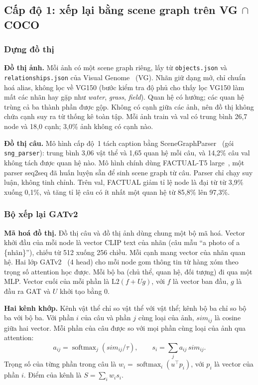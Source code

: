 \subsection{Cấp độ 1: xếp lại bằng scene graph trên VG $\cap$ COCO}
\label{sec:method-l1}

\subsubsection{Dựng đồ thị}\label{sec:l1-graphs}
\textbf{Đồ thị ảnh.} Mỗi ảnh có một scene graph riêng, lấy từ \texttt{objects.json} và \texttt{relationships.json} của
Visual Genome~\cite{krishna2017vg} (VG). Nhãn giữ dạng mở, chỉ chuẩn hoá alias, không lọc về VG150 (bước kiểm tra độ phủ cho
thấy lọc VG150 làm mất các nhãn hay gặp như \emph{water}, \emph{grass}, \emph{field}). Quan hệ có hướng; các quan hệ trùng
cả ba thành phần được gộp. Không có cạnh giữa các ảnh, nên đồ thị không chứa cạnh suy ra từ thống kê toàn tập. Mỗi ảnh
train và val có trung bình 26,7 node và 18,0 cạnh; 3,0\% ảnh không có cạnh nào.

\textbf{Đồ thị câu.} Mô hình cấp độ~1 tách caption bằng SceneGraphParser~\cite{schuster2015sgparser} (gói
\texttt{sng\_parser}): trung bình 3,06 vật thể và 1,65 quan hệ mỗi câu, và 14,2\% câu val không tách được quan hệ nào. Mô
hình chính dùng FACTUAL-T5 large~\cite{li2023factual}, một parser seq2seq đã huấn luyện sẵn để sinh scene graph từ câu.
Parser chỉ chạy suy luận, không tinh chỉnh. Trên val, FACTUAL giảm tỉ lệ node là đại từ từ 3,9\% xuống 0,1\%, và tăng tỉ lệ
câu có ít nhất một quan hệ từ 85,8\% lên 97,3\%.

\subsubsection{Bộ xếp lại GATv2}\label{sec:l1-model}
\textbf{Mã hoá đồ thị.} Đồ thị câu và đồ thị ảnh dùng chung một bộ mã hoá. Vector khởi đầu của mỗi node là vector CLIP
text của nhãn (câu mẫu ``a photo of a \{nhãn\}''), chiếu từ 512 xuống 256 chiều. Mỗi cạnh mang vector của nhãn quan hệ.
Hai lớp GATv2~\cite{brody2022gatv2} (4 head) cho mỗi node gom thông tin từ hàng xóm theo trọng số attention học được. Mỗi
bộ ba (chủ thể, quan hệ, đối tượng) đi qua một MLP. Vector cuối của mỗi phần là $\mathrm{L2}(f + U g)$, với $f$ là vector
ban đầu, $g$ là đầu ra GAT và $U$ khởi tạo bằng 0.

\textbf{Hai kênh khớp.} Kênh vật thể chỉ so vật thể với vật thể; kênh bộ ba chỉ so bộ ba với bộ ba. Với phần $i$ của câu
và phần $j$ cùng loại của ảnh, $\mathit{sim}_{ij}$ là cosine giữa hai vector. Mỗi phần của câu được so với mọi phần cùng
loại của ảnh qua attention:
\begin{equation}
a_{ij} = \operatorname{softmax}_j\!\left(\mathit{sim}_{ij}/\tau\right),\qquad s_i = \textstyle\sum_j a_{ij}\,\mathit{sim}_{ij}.
\end{equation}
Trọng số của từng phần trong câu là
$w_i = \operatorname{softmax}_i(u^\top p_i)$, với $p_i$ là vector của phần $i$. Điểm của kênh là
$S = \sum_i w_i s_i$.

